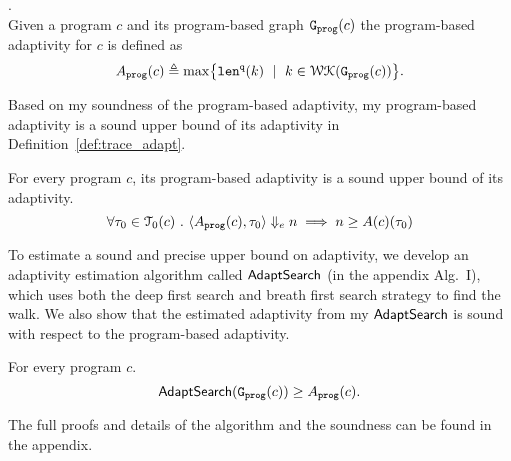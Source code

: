  \begin{defn}
 .
 \label{def:prog_adapt}
 \\
 {
 Given a program ${c}$ and its program-based graph 
 $\mathtt{{G_{prog}}}({c})$
 the program-based adaptivity for $c$ is 
 defined as%
 \[
 \progA({c})
 \triangleq \max
 \left\{ \qlen(k) \ \mid \  k\in \walks(\progG({c}))\right \}.
 \]
 }
 \end{defn}
 Based on my soundness of the program-based adaptivity, my program-based adaptivity is a sound upper bound of its adaptivity in Definition~\ref{def:trace_adapt}. 
 \begin{thm}
     \label{thm:sound_progadapt}
     For every program $c$, 
     its program-based adaptivity is a sound upper bound of its adaptivity.
      $$ \forall \mathtt{\tau}_0 \in \mathcal{T}_{0}(c) ~.~
 \langle A_{\mathtt{prog}}(c), \mathtt{\tau}_0 \rangle \Downarrow_e n \implies n \geq A(c)(\mathtt{\tau}_0) $$
 \end{thm}
 To estimate a sound and precise upper bound on adaptivity, we develop an adaptivity estimation algorithm called $\mathsf{AdaptSearch}$ (in the appendix Alg.~I), which uses both the deep first search and breath first search strategy to find the walk. We also show that the estimated adaptivity from my $\mathsf{AdaptSearch}$ is sound with respect to the program-based adaptivity. 
 \begin{thm}
     \label{thm:sound_adaptalg}
     For every program $c$.
      $$\mathsf{AdaptSearch}(\mathtt{{G_{prog}}}({c})) \geq A_{\mathtt{prog}}(c).$$
 \end{thm}
 The full proofs and details of the algorithm and the soundness can be found in the appendix.
 

